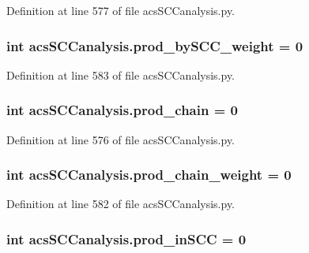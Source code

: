 Definition at line 577 of file acs\-S\-C\-Canalysis.\-py.

\hypertarget{a00128_a5f45dbe461b3b18021c93780e87cc40e}{
\subsubsection[{prod\-\_\-by\-S\-C\-C\-\_\-weight}]{\setlength{\rightskip}{0pt plus 5cm}int acs\-S\-C\-Canalysis.\-prod\-\_\-by\-S\-C\-C\-\_\-weight = 0}}\label{a00128_a5f45dbe461b3b18021c93780e87cc40e}


Definition at line 583 of file acs\-S\-C\-Canalysis.\-py.

\hypertarget{a00128_ab307c6047e4d16ec0335266b24e7db5a}{
\subsubsection[{prod\-\_\-chain}]{\setlength{\rightskip}{0pt plus 5cm}int acs\-S\-C\-Canalysis.\-prod\-\_\-chain = 0}}\label{a00128_ab307c6047e4d16ec0335266b24e7db5a}


Definition at line 576 of file acs\-S\-C\-Canalysis.\-py.

\hypertarget{a00128_a6736365f1f19058f6e1d57287383dbcc}{
\subsubsection[{prod\-\_\-chain\-\_\-weight}]{\setlength{\rightskip}{0pt plus 5cm}int acs\-S\-C\-Canalysis.\-prod\-\_\-chain\-\_\-weight = 0}}\label{a00128_a6736365f1f19058f6e1d57287383dbcc}


Definition at line 582 of file acs\-S\-C\-Canalysis.\-py.

\hypertarget{a00128_adbc76b0558ceb74d798b35146a583474}{
\subsubsection[{prod\-\_\-in\-S\-C\-C}]{\setlength{\rightskip}{0pt plus 5cm}int acs\-S\-C\-Canalysis.\-prod\-\_\-in\-S\-C\-C = 0}}\label{a00128_adbc76b0558ceb74d798b35146a583474}


